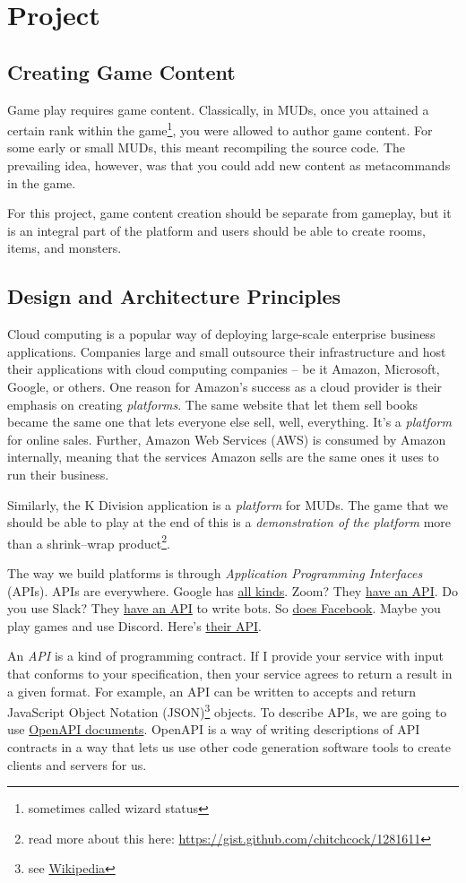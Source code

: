 \documentclass{article}
\newcommand{\enterProblemHeader}[1]{
}
\newcommand{\exitProblemHeader}[1]{
\nobreak\extramarks{#1}{}\nobreak
}
\newcounter{homeworkProblemCounter} %
\newcommand{\homeworkProblemName}{}
\newenvironment{homeworkProblem}[1][Problem \arabic{homeworkProblemCounter}]{ %
\stepcounter{homeworkProblemCounter} %
\renewcommand{\homeworkProblemName}{#1} %
\section{\homeworkProblemName} %
\enterProblemHeader{\homeworkProblemName} %
}{
\exitProblemHeader{\homeworkProblemName} %
}
\newcommand{\homeworkSectionName}{}
\newenvironment{homeworkSection}[1]{ %
\renewcommand{\homeworkSectionName}{#1} %
\subsection{\homeworkSectionName} %
\enterProblemHeader{\homeworkProblemName\ [\homeworkSectionName]} %
}{
\enterProblemHeader{\homeworkProblemName} %
}
\begin{document}
\begin{homeworkProblem}[Project]
\begin{homeworkSection}{Creating Game Content}
	Game play requires game content. Classically, in MUDs, once you attained a certain rank within the game\footnote{sometimes called wizard status}, you were allowed to author game content. For some early or small MUDs, this meant recompiling the source code. The prevailing idea, however, was that you could add new content as metacommands in the game.

	For this project, game content creation should be separate from gameplay, but it is an integral part of the platform and users should be able to create rooms, items, and monsters. 
\end{homeworkSection}

\begin{homeworkSection}{Design and Architecture Principles}
  Cloud computing is a popular way of deploying large-scale enterprise business applications. Companies large and small outsource their infrastructure and host their applications with cloud computing companies -- be it Amazon, Microsoft, Google, or others. One reason for Amazon's success as a cloud provider is their emphasis on creating \textit{platforms}. The same website that let them sell books became the same one that lets everyone else sell, well, everything. It's a \textit{platform} for online sales. Further, Amazon Web Services (AWS) is consumed by Amazon internally, meaning that the services Amazon sells are the same ones it uses to run their business.
  
  Similarly, the K Division application is a \textit{platform} for MUDs. The game that we should be able to play at the end of this is a \textit{demonstration of the platform} more than a shrink--wrap product\footnote{read more about this here: \url{https://gist.github.com/chitchcock/1281611}}.
  
  The way we build platforms is through \textit{Application Programming Interfaces} (APIs). APIs are everywhere. Google has \href{https://developers.google.com/apis-explorer}{all kinds}. Zoom? They \href{https://marketplace.zoom.us/docs/api-reference/zoom-api}{have an API}. Do you use Slack? They \href{https://api.slack.com/}{have an API} to write bots. So \href{https://developers.facebook.com/}{does Facebook}. Maybe you play games and use Discord. Here's \href{https://discord.com/developers/docs/intro}{their API}.
  
	An \textit{API} is a kind of programming contract. If I provide your service with input that conforms to your specification, then your service agrees to return a result in a given format. For example, an API can be written to accepts and return JavaScript Object Notation (JSON)\footnote{see \href{https://en.wikipedia.org/wiki/JSON}{Wikipedia}} objects. To describe APIs, we are going to use \href{https://swagger.io/specification/}{OpenAPI documents}. OpenAPI is a way of writing descriptions of API contracts in a way that lets us use other code generation software tools to create clients and servers for us.


\end{homeworkSection}
\end{homeworkProblem}
\end{document}
